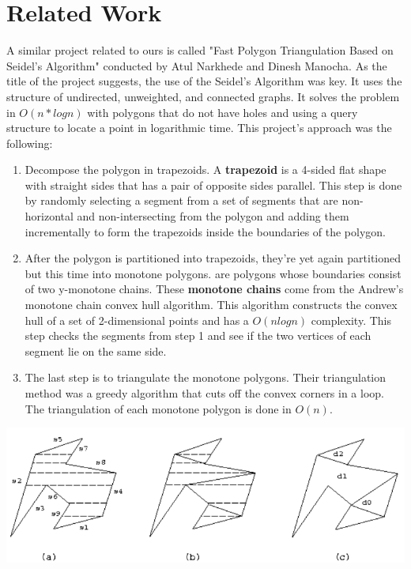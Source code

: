 \documentclass[conference]{IEEEtran}
\begin{document}
\section{Related Work}\justifying

A similar project related to ours is called "Fast Polygon Triangulation Based on Seidel's Algorithm"\cite{relatedProject} conducted by Atul Narkhede and Dinesh Manocha. As the title of the project suggests, the use of the Seidel's Algorithm was key. It uses the structure of undirected, unweighted, and connected graphs. It solves the problem in $O(n*logn)$ with polygons that do not have holes and using a query structure to locate a point in logarithmic time. This project's approach was the following:
\begin{enumerate}
    \item Decompose the polygon in trapezoids. A \textbf{trapezoid} is a 4-sided flat shape with straight sides that has a pair of opposite sides parallel. This step is done by randomly selecting a segment from a set of segments that are non-horizontal and non-intersecting from the polygon and adding them incrementally to form the trapezoids inside the boundaries of the polygon.
    \item After the polygon is partitioned into trapezoids, they're yet again partitioned but this time into monotone polygons.  are polygons whose boundaries consist of two y-monotone chains. These \textbf{monotone chains} come from the Andrew's monotone chain convex hull algorithm. This algorithm constructs the convex hull of a set of 2-dimensional points and has a $O(nlogn)$ complexity. This step checks the segments from step 1 and see if the two vertices of each segment lie on the same side.
    \item The last step is to triangulate the monotone polygons. Their triangulation method was a greedy algorithm that cuts off the convex corners in a loop. The triangulation of each monotone polygon is done in $O(n)$.
\end{enumerate}
\centering
\includegraphics[scale=0.5]{relatedWork}
\end{document}

